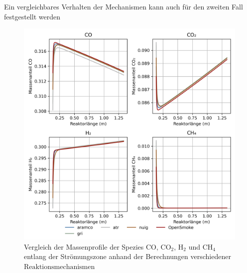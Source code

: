         \alert{Ein vergleichbares Verhalten der Mechanismen kann auch für den zweiten Fall festgestellt werden}
        \begin{figure}[H]
            \centering
            \includegraphics[width=0.6\linewidth]{img/Vergleich_mech/H2_CH4_CO_CO2.png}
            \caption{Vergleich der Massenprofile der Spezies CO, CO$_2$, H$_2$ und CH$_4$ entlang der Strömungszone anhand der Berechnungen verschiedener $\mbox{Reaktionsmechanismen}$}
            \label{fig:auswertung_verläufe_mechanismen_keinco2}
        \end{figure}

